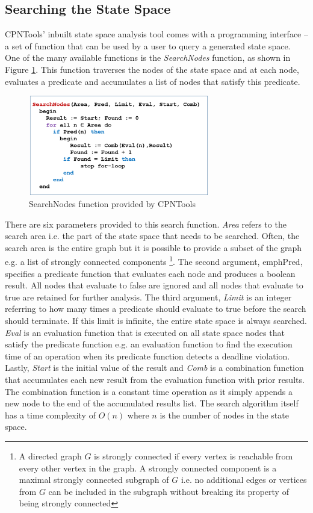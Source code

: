\subsection{Searching the State Space}

CPNTools' inbuilt state space analysis tool comes with a programming interface -- a set of function that can be used by a user to query a generated state space. One of the many available functions is the \emph{SearchNodes} function, as shown in Figure \ref{fig:SSSearching}. This function traverses the nodes of the state space and at each node, evaluates a predicate and accumulates a list of nodes that satisfy this predicate. 

\begin{figure}[htb]
	\centering
	\includegraphics[width=0.7\textwidth]{./img/state-space-searching.png}
	\caption{SearchNodes function provided by CPNTools}
	\label{fig:SSSearching}
\end{figure}
\FloatBarrier

There are six parameters provided to this search function. \emph{Area} refers to the search area i.e. the part of the state space that needs to be searched. Often, the search area is the entire graph but it is possible to provide a subset of the graph e.g. a list of strongly connected components \footnote{A directed graph $G$ is strongly connected if every vertex is reachable from every other vertex in the graph. A strongly connected component is a maximal strongly connected subgraph of $G$ i.e. no additional edges or vertices from $G$ can be included in the subgraph without breaking its property of being strongly connected}. The second argument, emph{Pred}, specifies a predicate function that evaluates each node and produces a boolean result. All nodes that evaluate to false are ignored and all nodes that evaluate to true are retained for further analysis. The third argument, \emph{Limit} is an integer referring to how many times a predicate should evaluate to true before the search should terminate. If this limit is infinite, the entire state space is always searched. \emph{Eval} is an evaluation function that is executed on all state space nodes that satisfy the predicate function e.g. an evaluation function to find the execution time of an operation when its predicate function detects a deadline violation. Lastly, \emph{Start} is the initial value of the result and \emph{Comb} is a combination function that accumulates each new result from the evaluation function with prior results. The combination function is a constant time operation as it simply appends a new node to the end of the accumulated results list. The search algorithm itself has a time complexity of $O(n)$ where $n$ is the number of nodes in the state space. 


